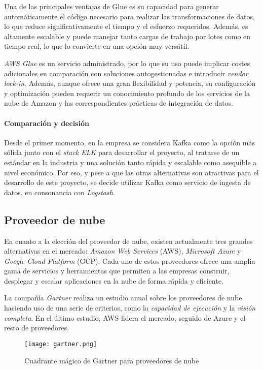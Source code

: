 Una de las principales ventajas de Glue es su capacidad para generar
automáticamente el código necesario para realizar las transformaciones de datos,
lo que reduce significativamente el tiempo y el esfuerzo requeridos. Además, es
altamente escalable y puede manejar tanto cargas de trabajo por lotes como en
tiempo real, lo que lo convierte en una opción muy versátil.

\textit{AWS Glue} es un servicio administrado, por lo que su uso puede implicar
costes adicionales en comparación con soluciones autogestionadas e introducir
\textit{vendor lock-in}. Además, aunque ofrece una gran flexibilidad y potencia,
su configuración y optimización pueden requerir un conocimiento profundo de los
servicios de la nube de Amazon y las correspondientes prácticas de integración
de datos.


\paragraph{Comparación y decisión}
Desde el primer momento, en la empresa se considera Kafka como la opción más
sólida junto con el \textit{stack ELK} para desarrollar el proyecto, al
tratarse de un estándar en la industria y una solución tanto rápida y escalable
como asequible a nivel económico. Por eso, y pese a que las otras alternativas
son atractivas para el desarrollo de este proyecto, se decide utilizar Kafka
como servicio de ingesta de datos, en consonancia con \textit{Logstash}.



\newpage{}
\subsection{Proveedor de nube}\label{subsec:alt_proveedor}
En cuanto a la elección del proveedor de nube, existen actualmente tres
grandes alternativas en el mercado: \textit{Amazon Web Services} (AWS),
\textit{Microsoft Azure} y \textit{Google Cloud Platform} (GCP). Cada uno de
estos proveedores ofrece una amplia gama de servicios y herramientas que
permiten a las empresas construir, desplegar y escalar aplicaciones en la nube
de forma rápida y eficiente.

La compañía \textit{Gartner} realiza un estudio anual sobre los proveedores de
nube haciendo uso de una serie de criterios, como la \textit{capacidad de
ejecución} y la \textit{visión completa}. En el último estudio, AWS lidera el
mercado, seguido de Azure y el resto de proveedores.

\begin{figure}[H]
	\centering
	\texttt{[image: gartner.png]}
	\caption{Cuadrante mágico de Gartner para proveedores de nube}
	\label{fig:gartner}
\end{figure}

